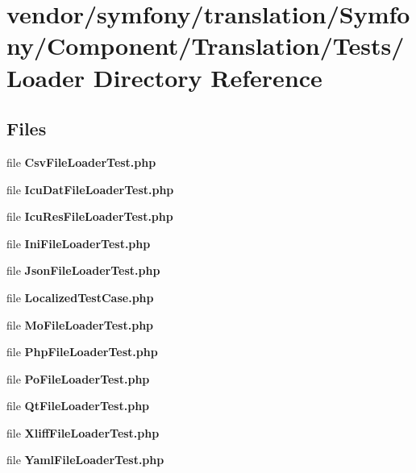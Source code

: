 \section{vendor/symfony/translation/\+Symfony/\+Component/\+Translation/\+Tests/\+Loader Directory Reference}
\label{dir_bd9e3b829bef43a8021782226771a3d9}
\subsection*{Files}
\begin{DoxyCompactItemize}
\item 
file {\bf Csv\+File\+Loader\+Test.\+php}
\item 
file {\bf Icu\+Dat\+File\+Loader\+Test.\+php}
\item 
file {\bf Icu\+Res\+File\+Loader\+Test.\+php}
\item 
file {\bf Ini\+File\+Loader\+Test.\+php}
\item 
file {\bf Json\+File\+Loader\+Test.\+php}
\item 
file {\bf Localized\+Test\+Case.\+php}
\item 
file {\bf Mo\+File\+Loader\+Test.\+php}
\item 
file {\bf Php\+File\+Loader\+Test.\+php}
\item 
file {\bf Po\+File\+Loader\+Test.\+php}
\item 
file {\bf Qt\+File\+Loader\+Test.\+php}
\item 
file {\bf Xliff\+File\+Loader\+Test.\+php}
\item 
file {\bf Yaml\+File\+Loader\+Test.\+php}
\end{DoxyCompactItemize}
